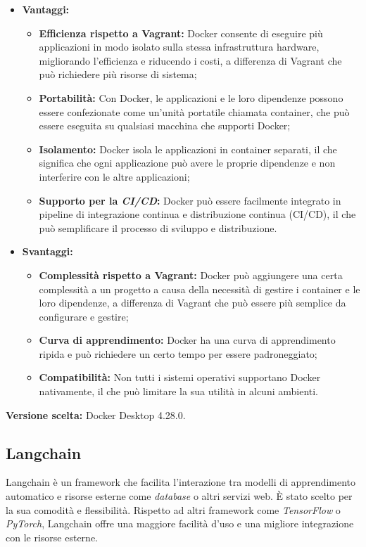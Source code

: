 \documentclass[10pt, a4paper]{article}
\begin{document}
\begin{itemize}
\item \textbf{Vantaggi:}
\begin{itemize}
\item \textbf{Efficienza rispetto a Vagrant:} Docker consente di eseguire più applicazioni in modo isolato sulla stessa infrastruttura hardware, migliorando l'efficienza e riducendo i costi, a differenza di Vagrant che può richiedere più risorse di sistema;
\item \textbf{Portabilità:} Con Docker, le applicazioni e le loro dipendenze possono essere confezionate come un'unità portatile chiamata container, che può essere eseguita su qualsiasi macchina che supporti Docker;
\item \textbf{Isolamento:} Docker isola le applicazioni in container separati, il che significa che ogni applicazione può avere le proprie dipendenze e non interferire con le altre applicazioni;
\item \textbf{Supporto per la \textit{CI/CD\pg}:} Docker può essere facilmente integrato in pipeline di integrazione continua e distribuzione continua (CI/CD), il che può semplificare il processo di sviluppo e distribuzione.
\end{itemize}
\item \textbf{Svantaggi:}
\begin{itemize}
\item \textbf{Complessità rispetto a Vagrant:} Docker può aggiungere una certa complessità a un progetto a causa della necessità di gestire i container e le loro dipendenze, a differenza di Vagrant che può essere più semplice da configurare e gestire;
\item \textbf{Curva di apprendimento:} Docker ha una curva di apprendimento ripida e può richiedere un certo tempo per essere padroneggiato;
\item \textbf{Compatibilità:} Non tutti i sistemi operativi supportano Docker nativamente, il che può limitare la sua utilità in alcuni ambienti.
\end{itemize}
\end{itemize}
\textbf{Versione scelta:} Docker Desktop 4.28.0.

\subsection{Langchain}
Langchain è un framework che facilita l'interazione tra modelli di apprendimento automatico e risorse esterne come \textit{database\pg} o altri servizi web. È stato scelto per la sua comodità e flessibilità. Rispetto ad altri framework come \textit{TensorFlow\pg} o \textit{PyTorch\pg}, Langchain offre una maggiore facilità d'uso e una migliore integrazione con le risorse esterne.
\end{document}
